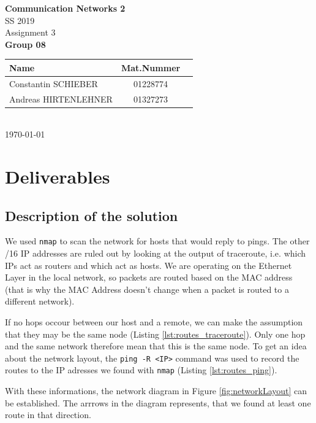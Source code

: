 \documentclass[parskip=full]{scrartcl}
\begin{document}
\begin{titlepage}
    \centering
    \vspace*{2cm}
    {\Huge \textbf{Communication Networks 2}}\\
    SS 2019\\
    \vspace*{1cm}
    {\Large Assignment 3}
    \\\vspace*{3cm}
    {\Large \textbf{Group 08}}\\
    \vspace*{1cm}
    {\large 
        \begin{tabular}{l c c}
            Name & Mat.Nummer \\ \hline
            Constantin SCHIEBER & 01228774 \\
            Andreas HIRTENLEHNER & 01327273
        \end{tabular}
    }
    \\\vspace*{7cm}
    \today
\end{titlepage}

\section{Deliverables}

\subsection{Description of the solution}
We used \texttt{nmap} to scan the network for hosts that would reply to pings. 
The other /16 IP addresses are ruled out by looking at the output of traceroute, i.e. which IPs act as routers and which act as hosts.
We are operating on the Ethernet Layer in the local network, so packets are routed based on the MAC address (that is why the MAC Address doesn't change when a packet is routed to a different network).

If no hops occour between our host and a remote, we can make the assumption that they may be the same node (Listing \ref{lst:routes_traceroute}).
Only one hop and the same network therefore mean that this is the same node.
To get an idea about the network layout, the \texttt{ping -R <IP>} command was used to record the routes to the IP adresses we found with \texttt{nmap} (Listing \ref{lst:routes_ping}).

With these informations, the network diagram in Figure \ref{fig:networkLayout} can be established. The arrrows in the diagram represents, that we found at least one route in that direction. 
\end{document}
